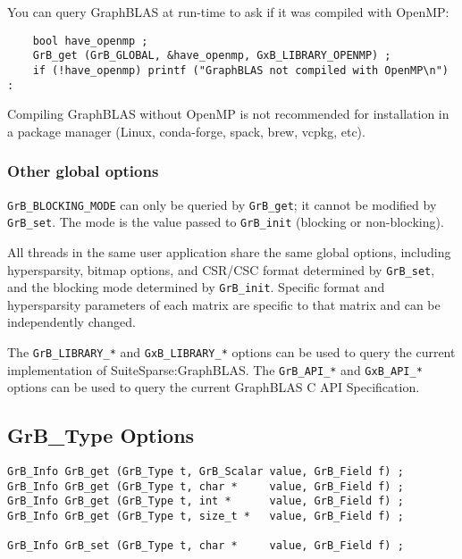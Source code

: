You can query GraphBLAS at run-time to ask if it was compiled with OpenMP:

{\small
\begin{verbatim}
    bool have_openmp ;
    GrB_get (GrB_GLOBAL, &have_openmp, GxB_LIBRARY_OPENMP) ;
    if (!have_openmp) printf ("GraphBLAS not compiled with OpenMP\n") : \end{verbatim}}

Compiling GraphBLAS without OpenMP is not recommended for installation in a
package manager (Linux, conda-forge, spack, brew, vcpkg, etc).

\subsubsection{Other global options}

\verb'GrB_BLOCKING_MODE' can only be queried by \verb'GrB_get'; it cannot be
modified by \verb'GrB_set'.  The mode is the value passed to \verb'GrB_init'
(blocking or non-blocking).

All threads in the same user application share the same global options,
including hypersparsity, bitmap options, and CSR/CSC format determined by
\verb'GrB_set', and the blocking mode determined by \verb'GrB_init'.
Specific format and hypersparsity parameters of each matrix are specific to
that matrix and can be independently changed.

The \verb'GrB_LIBRARY_*' and \verb'GxB_LIBRARY_*' options can be used to query
the current implementation of SuiteSparse:GraphBLAS.  The \verb'GrB_API_*' and
\verb'GxB_API_*' options can be used to query the current GraphBLAS C API
Specification.

\newpage
\subsection{{\sf GrB\_Type} Options}
\label{get_set_type}

\begin{mdframed}[userdefinedwidth=6in]
{\footnotesize
\begin{verbatim}
GrB_Info GrB_get (GrB_Type t, GrB_Scalar value, GrB_Field f) ;
GrB_Info GrB_get (GrB_Type t, char *     value, GrB_Field f) ;
GrB_Info GrB_get (GrB_Type t, int *      value, GrB_Field f) ;
GrB_Info GrB_get (GrB_Type t, size_t *   value, GrB_Field f) ;

GrB_Info GrB_set (GrB_Type t, char *     value, GrB_Field f) ;
\end{verbatim}
}\end{mdframed}

